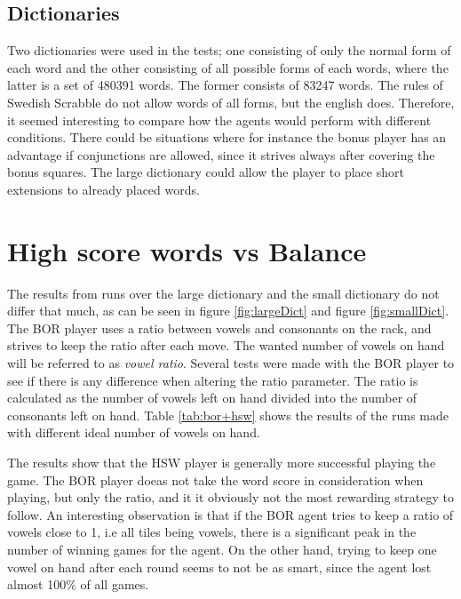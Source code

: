 \documentclass[a4paper, 12pt]{report}
\begin{document}
\subsection{Dictionaries}
Two dictionaries were used in the tests; one consisting of only the normal form of each word and the other consisting of all possible forms of each words, where the latter is a set of 480391 words. The former consists of 83247 words. The rules of Swedish Scrabble do not allow words of all forms, but the english does. Therefore, it seemed interesting to compare how the agents would perform with different conditions. There could be situations where for instance the bonus player has an advantage if conjunctions are allowed, since it strives always after covering the bonus squares. The large dictionary could allow the player to place short extensions to already placed words.

\graphicspath{{../results/Plots/}}
\section{High score words vs Balance}
\label{sec:highBalance}

The results from runs over the large dictionary and the small dictionary do not differ that much, as can be seen in figure \ref{fig:largeDict} and figure \ref{fig:smallDict}.
The BOR player uses a ratio between vowels and consonants on the rack, and strives to keep the ratio after each move. The wanted number of vowels on hand will be referred to as \emph{vowel ratio}. Several tests were made with the BOR player to see if there is any difference when altering the ratio parameter. The ratio is calculated as the number of vowels left on hand divided into the number of consonants left on hand. Table \ref{tab:bor+hsw} shows the results of the runs made with different ideal number of vowels on hand.

The results show that the HSW player is generally more successful playing the game. The BOR player doeas not take the word score in consideration when playing, but only the ratio, and it it obviously not the most rewarding strategy to follow. An interesting observation is that if the BOR agent tries to keep a ratio of vowels close to 1, i.e all tiles being vowels, there is a significant peak in the number of winning games for the agent. On the other hand, trying to keep one vowel on hand after each round seems to not be as smart, since the agent lost almost 100\% of all games.
\end{document}
